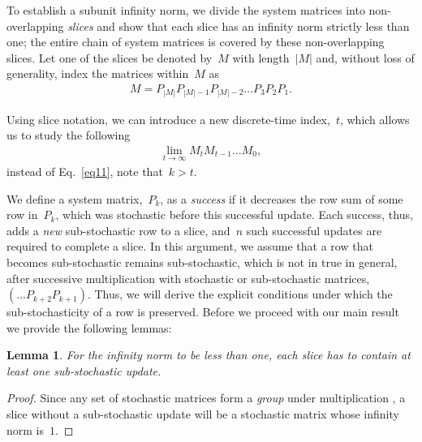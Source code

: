 \documentclass[draftclsnofoot, onecolumn, 12pt]{IEEEtran}
\newtheorem{lem}{Lemma}
\begin{document}
To establish a subunit infinity norm, we divide the system matrices into non-overlapping \textit{slices} and show that each slice has an infinity norm strictly less than one; the entire chain of system matrices is covered by these non-overlapping slices. Let one of the slices be denoted by~$M$ with length~$|M|$ and, without loss of generality, index the matrices within~$M$ as
\begin{eqnarray}\label{M}
{{M}} = P_{|{{M}}|}P_{|{{M}}|-1}P_{|{{M}}|-2}\ldots P_{3}P_{2}P_{1}.
\end{eqnarray}

\noindent Using slice notation, we can introduce a new discrete-time index,~$t$, which allows us to study the following
\begin{eqnarray}
\lim_{t \rightarrow \infty}{{M}}_{t}{{M}}_{t-1}\ldots{{M}_{0}},
\end{eqnarray}
instead of Eq.~\eqref{eq11}, note that~$ k > t$. 

We define a system matrix,~$P_k$, as a \textit{success} if it decreases the row sum of some row in~$P_k$, which was stochastic before this successful update. Each success, thus, adds a \emph{new} sub-stochastic row to a slice, and~$n$ such successful updates are required to complete a slice. In this argument, we assume that a row that becomes sub-stochastic remains sub-stochastic, which is not in true in general, after successive multiplication with stochastic or sub-stochastic matrices,~$\left(\ldots P_{k+2}P_{k+1}\right)$. Thus, we will derive the explicit conditions under which the sub-stochasticity of a row is preserved. Before we proceed with our main result we provide the following lemmas:

\begin{lem}\label{lem1}
For the infinity norm to be less than one, each slice has to contain at least one sub-stochastic update.
\end{lem}
\begin{proof}
Since any set of stochastic matrices form a \textit{group} under multiplication \cite{anton2010elementary}, a slice without a sub-stochastic update will be a stochastic matrix whose infinity norm is~$1$.
\end{proof}
\end{document}
